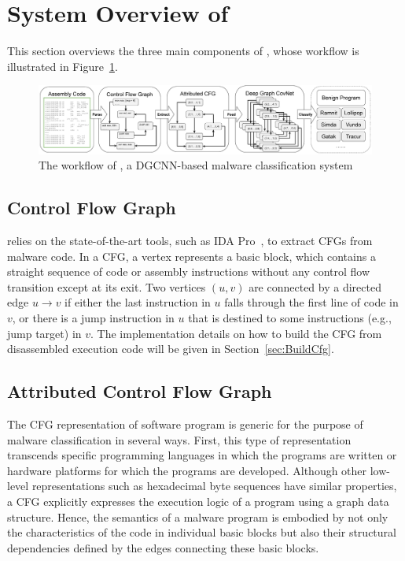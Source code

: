 \section{System Overview of \sysname}
\label{sec:System}

This section overviews the three main components of \sysname, whose workflow is illustrated in Figure~\ref{fig:SystemPipeline}.

\begin{figure}[htbp]
\centerline{\includegraphics[width=1.0\textwidth]{Magic/figures/SystemPipeline.eps}}
\caption{The workflow of \sysname, a DGCNN-based malware classification system}
\label{fig:SystemPipeline}
\end{figure}

\subsection{Control Flow Graph}\label{subsec:ConstructCfg}

\sysname relies on the state-of-the-art tools, such as IDA Pro~\cite{bib:idapro}, to extract CFGs from malware code.
In a CFG, a vertex represents a basic block, which contains a straight sequence of code or assembly instructions without any control flow transition except at its exit.
Two vertices $(u, v)$ are connected by a directed edge $u \rightarrow v$ if either the last instruction in $u$ falls through the first line of code in $v$,
or there is a jump instruction in $u$ that is destined to some instructions (e.g., jump target) in $v$.
The implementation details on how to build the CFG from disassembled execution code will be given in Section~\ref{sec:BuildCfg}.

\subsection{Attributed Control Flow Graph}\label{subsec:Cfg2Acfg}
The CFG representation of software program is generic for the purpose of malware classification in several ways.
First, this type of representation transcends specific programming languages in which the programs are written or hardware platforms for which the programs are developed.
Although other low-level representations such as hexadecimal byte sequences have similar properties, a CFG explicitly expresses the execution logic of a program using a graph data structure.
Hence, the semantics of a malware program is embodied by not only the characteristics of the code in individual basic blocks but also their structural dependencies defined by the edges connecting these basic blocks. 


